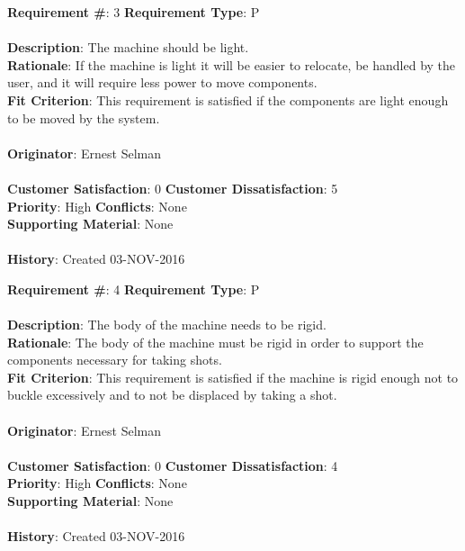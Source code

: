 \documentclass[titlepage]{article}
\begin{document}
\begin{framed}
	\noindent\textbf{Requirement \#}: 3 \hfill \textbf{Requirement Type}: P \hfill\\\\
	\noindent\textbf{Description}: The machine should be light.\\
	\textbf{Rationale}: If the machine is light it will be easier to relocate, be handled by the user, and it will require less power to move components.\\
	\textbf{Fit Criterion}: This requirement is satisfied if the components are light enough to be moved by the system.\\\\
	\textbf{Originator}: Ernest Selman\\\\
	\noindent\textbf{Customer Satisfaction}: 0 \hfill 	\textbf{Customer Dissatisfaction}: 5 \hfill\\
	\textbf{Priority}: High \hfill \textbf{Conflicts}: None \hfill\\
	\textbf{Supporting Material}: None\\\\
	\noindent\textbf{History}: Created 03-NOV-2016
\end{framed}

\begin{framed}
	\noindent\textbf{Requirement \#}: 4 \hfill \textbf{Requirement Type}: P \hfill\\\\
	\noindent\textbf{Description}: The body of the machine needs to be rigid. \\
	\textbf{Rationale}: The body of the machine must be rigid in order to support the components necessary for taking shots.\\
	\textbf{Fit Criterion}: This requirement is satisfied if the machine is rigid enough not to buckle excessively and to not be displaced by taking a shot.\\\\
	\textbf{Originator}: Ernest Selman\\\\
	\noindent\textbf{Customer Satisfaction}: 0 \hfill 	\textbf{Customer Dissatisfaction}: 4 \hfill\\
	\textbf{Priority}: High \hfill \textbf{Conflicts}: None \hfill\\
	\textbf{Supporting Material}: None\\\\
	\noindent\textbf{History}: Created 03-NOV-2016
\end{framed}
\end{document}
